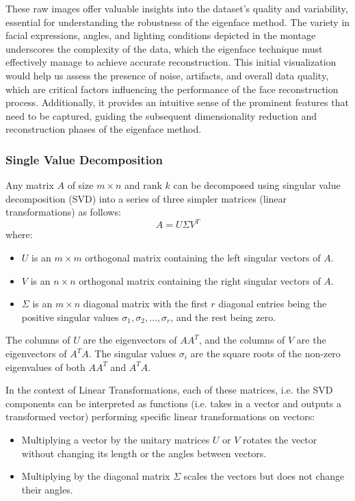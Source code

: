 \documentclass{article} %
\theoremstyle{definition}
\theoremstyle{remark}
\theoremstyle{plain}
\begin{document}
        These raw images offer valuable insights into the dataset's quality and variability, essential for understanding the robustness of the eigenface method. The variety in facial expressions, angles, and lighting conditions depicted in the montage underscores the complexity of the data, which the eigenface technique must effectively manage to achieve accurate reconstruction. This initial visualization would help us assess the presence of noise, artifacts, and overall data quality, which are critical factors influencing the performance of the face reconstruction process. Additionally, it provides an intuitive sense of the prominent features that need to be captured, guiding the subsequent dimensionality reduction and reconstruction phases of the eigenface method.

    \subsubsection{Single Value Decomposition}
        Any matrix \(A\) of size \(m \times n\) and rank \(k\) can be decomposed using singular value decomposition (SVD) into a series of three simpler matrices (linear transformations) as follows:
        \[
        A = U \Sigma V^T
        \]
        where:

        \begin{itemize}[label={--}]
            \item \(U\) is an \(m \times m\) orthogonal matrix containing the left singular vectors of \(A\).
            \item \(V\) is an \(n \times n\) orthogonal matrix containing the right singular vectors of \(A\).
            \item \(\Sigma\) is an \(m \times n\) diagonal matrix with the first \(r\) diagonal entries being the positive singular values \(\sigma_1, \sigma_2, \ldots, \sigma_r\), and the rest being zero.
        \end{itemize}
        
        The columns of \(U\) are the eigenvectors of \(AA^T\), and the columns of \(V\) are the eigenvectors of \(A^TA\). The singular values \(\sigma_i\) are the square roots of the non-zero eigenvalues of both \(AA^T\) and \(A^T A\).
        
        In the context of Linear Transformations, each of these matrices, i.e. the SVD components can be interpreted as functions (i.e. takes in a vector and outputs a transformed vector) performing specific linear transformations on vectors:
        \begin{itemize}[label={--}]
            \item Multiplying a vector by the unitary matrices \(U\) or \(V\) rotates the vector without changing its length or the angles between vectors.
            \item Multiplying by the diagonal matrix \(\Sigma\) scales the vectors but does not change their angles.
        \end{itemize}
\end{document}
